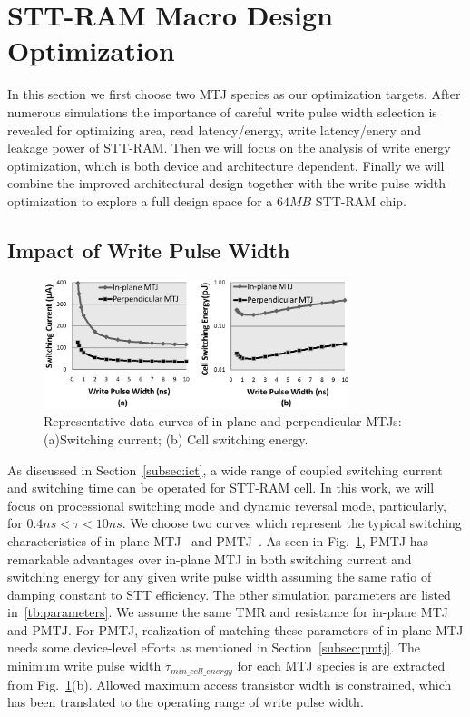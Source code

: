 \section{STT-RAM Macro Design Optimization} \label{sec:opt}
In this section we first choose two MTJ species as our optimization targets. After numerous simulations the importance of careful write pulse width selection is revealed for optimizing area, read latency/energy, write latency/enery and leakage power of STT-RAM. Then we will focus on the analysis of write energy optimization, which is both device and architecture dependent. Finally we will combine the improved architectural design together with the write pulse width optimization to explore a full design space for a $64MB$ STT-RAM chip.

\subsection{Impact of Write Pulse Width}

\begin{figure}[t]
  \centering
  \includegraphics[width=3.5in]{fig/MTJSpec.eps}
  \vspace{-10pt}
  \caption{Representative data curves of in-plane and perpendicular MTJs: (a)Switching current; (b) Cell switching energy.}
  \label{fig:specs}
  \vspace{-5pt}
\end{figure}

As discussed in Section~\ref{subsec:ict}, a wide range of coupled switching current and switching time can be operated for STT-RAM cell. In this work, we will focus on processional switching mode and dynamic reversal mode, particularly, for $0.4ns < \tau < 10ns$. We choose two curves which represent the typical switching characteristics of in-plane MTJ~\cite{STTRAM:Qualcomm09} and PMTJ~\cite{PMTJ:Toshiba08}. As seen in Fig.~\ref{fig:specs}, PMTJ has remarkable advantages over in-plane MTJ in both switching current and switching energy for any given write pulse width assuming the same ratio of damping constant to STT efficiency. The other simulation parameters are listed in~\ref{tb:parameters}. We assume the same TMR and resistance for in-plane MTJ and PMTJ. For PMTJ, realization of matching these parameters of in-plane MTJ needs some device-level efforts as mentioned in Section~\ref{subsec:pmtj}. The minimum write pulse width $\tau_{min\_cell\_energy}$ for each MTJ species is are extracted from Fig.~\ref{fig:specs}(b). Allowed maximum access transistor width is constrained, which has been translated to the operating range of write pulse width.

